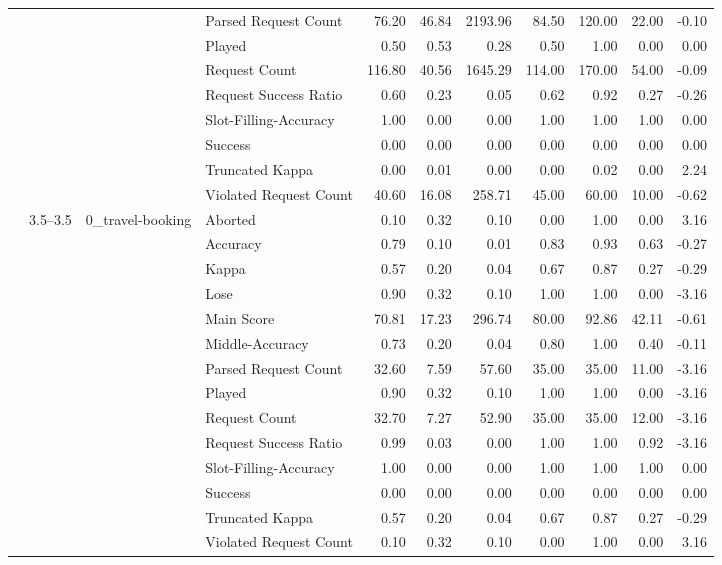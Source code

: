 \begin{tabular}{llllrrrrrrr}
 &  &  & Parsed Request Count & 76.20 & 46.84 & 2193.96 & 84.50 & 120.00 & 22.00 & -0.10 \\
 &  &  & Played & 0.50 & 0.53 & 0.28 & 0.50 & 1.00 & 0.00 & 0.00 \\
 &  &  & Request Count & 116.80 & 40.56 & 1645.29 & 114.00 & 170.00 & 54.00 & -0.09 \\
 &  &  & Request Success Ratio & 0.60 & 0.23 & 0.05 & 0.62 & 0.92 & 0.27 & -0.26 \\
 &  &  & Slot-Filling-Accuracy & 1.00 & 0.00 & 0.00 & 1.00 & 1.00 & 1.00 & 0.00 \\
 &  &  & Success & 0.00 & 0.00 & 0.00 & 0.00 & 0.00 & 0.00 & 0.00 \\
 &  &  & Truncated Kappa & 0.00 & 0.01 & 0.00 & 0.00 & 0.02 & 0.00 & 2.24 \\
 &  &  & Violated Request Count & 40.60 & 16.08 & 258.71 & 45.00 & 60.00 & 10.00 & -0.62 \\
\cline{2-11} \cline{3-11}
 & \multirow[t]{70}{*}{3.5--3.5} & \multirow[t]{14}{*}{0_travel-booking} & Aborted & 0.10 & 0.32 & 0.10 & 0.00 & 1.00 & 0.00 & 3.16 \\
 &  &  & Accuracy & 0.79 & 0.10 & 0.01 & 0.83 & 0.93 & 0.63 & -0.27 \\
 &  &  & Kappa & 0.57 & 0.20 & 0.04 & 0.67 & 0.87 & 0.27 & -0.29 \\
 &  &  & Lose & 0.90 & 0.32 & 0.10 & 1.00 & 1.00 & 0.00 & -3.16 \\
 &  &  & Main Score & 70.81 & 17.23 & 296.74 & 80.00 & 92.86 & 42.11 & -0.61 \\
 &  &  & Middle-Accuracy & 0.73 & 0.20 & 0.04 & 0.80 & 1.00 & 0.40 & -0.11 \\
 &  &  & Parsed Request Count & 32.60 & 7.59 & 57.60 & 35.00 & 35.00 & 11.00 & -3.16 \\
 &  &  & Played & 0.90 & 0.32 & 0.10 & 1.00 & 1.00 & 0.00 & -3.16 \\
 &  &  & Request Count & 32.70 & 7.27 & 52.90 & 35.00 & 35.00 & 12.00 & -3.16 \\
 &  &  & Request Success Ratio & 0.99 & 0.03 & 0.00 & 1.00 & 1.00 & 0.92 & -3.16 \\
 &  &  & Slot-Filling-Accuracy & 1.00 & 0.00 & 0.00 & 1.00 & 1.00 & 1.00 & 0.00 \\
 &  &  & Success & 0.00 & 0.00 & 0.00 & 0.00 & 0.00 & 0.00 & 0.00 \\
 &  &  & Truncated Kappa & 0.57 & 0.20 & 0.04 & 0.67 & 0.87 & 0.27 & -0.29 \\
 &  &  & Violated Request Count & 0.10 & 0.32 & 0.10 & 0.00 & 1.00 & 0.00 & 3.16 \\

\end{tabular}

